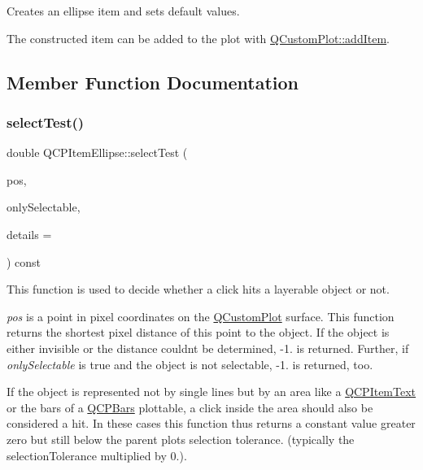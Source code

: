 Creates an ellipse item and sets default values.

The constructed item can be added to the plot with \mbox{\hyperlink{class_q_custom_plot_aa500620379262321685cb7a7674cbd2a}{Q\+Custom\+Plot\+::add\+Item}}. 

\subsection{Member Function Documentation}
\mbox{\label{class_q_c_p_item_ellipse_aa41be2180b2ace2e303b88d005c14243}} 
\subsubsection{\texorpdfstring{select\+Test()}{selectTest()}}
{\footnotesize\ttfamily double Q\+C\+P\+Item\+Ellipse\+::select\+Test (\begin{DoxyParamCaption}\item[{const Q\+PointF \&}]{pos,  }\item[{bool}]{only\+Selectable,  }\item[{Q\+Variant $\ast$}]{details = {} }\end{DoxyParamCaption}) const\hspace{0.3cm}{\ttfamily [virtual]}}

This function is used to decide whether a click hits a layerable object or not.

{\itshape pos} is a point in pixel coordinates on the \mbox{\hyperlink{class_q_custom_plot}{Q\+Custom\+Plot}} surface. This function returns the shortest pixel distance of this point to the object. If the object is either invisible or the distance couldn\textquotesingle{}t be determined, -\/1. is returned. Further, if {\itshape only\+Selectable} is true and the object is not selectable, -\/1. is returned, too.

If the object is represented not by single lines but by an area like a \mbox{\hyperlink{class_q_c_p_item_text}{Q\+C\+P\+Item\+Text}} or the bars of a \mbox{\hyperlink{class_q_c_p_bars}{Q\+C\+P\+Bars}} plottable, a click inside the area should also be considered a hit. In these cases this function thus returns a constant value greater zero but still below the parent plot\textquotesingle{}s selection tolerance. (typically the selection\+Tolerance multiplied by 0.).

